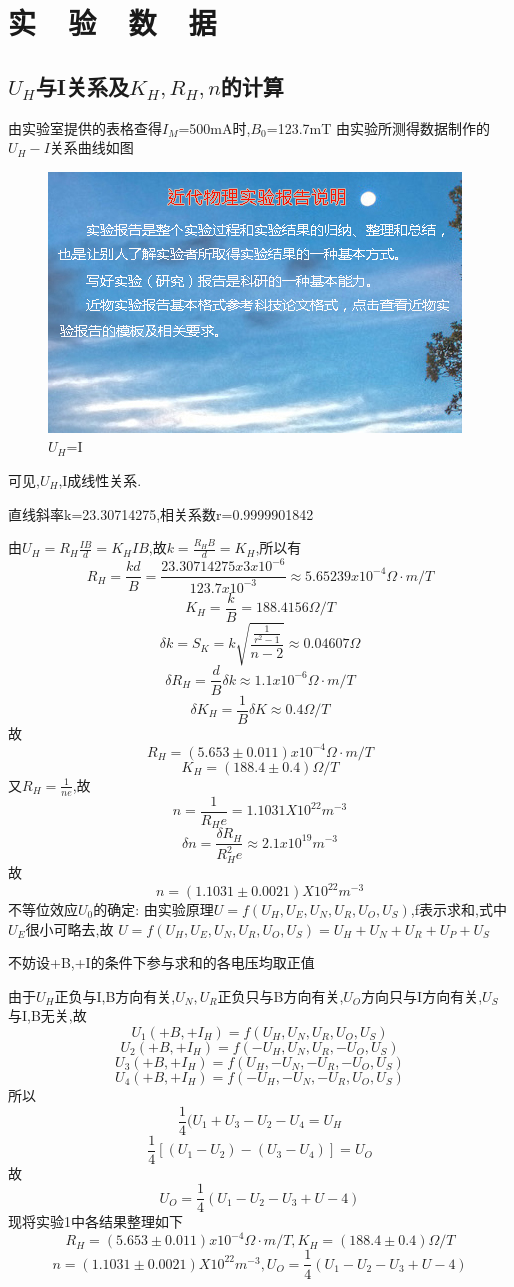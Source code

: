 \documentclass{thuemp}
\begin{document}
\section{实~~验~~数~~据}

\subsection{$U_{H}$与I关系及$K_{H},R_{H},n$的计算}

由实验室提供的表格查得$I_{M}$=500mA时,$B_{0}$=123.7mT
由实验所测得数据制作的$U_{H}-I$关系曲线如图
\begin{figure}[H]
	\centering
	\includegraphics[width=0.8\linewidth]{./image/example.jpg}
	\caption{$U_{H}$=I} \label{fig:eg}
\end{figure}
可见,$U_{H}$,I成线性关系.

直线斜率k=23.30714275,相关系数r=0.9999901842

由$U_{H}=R_{H}\frac{IB}{d}=K_{H}IB$,故$k=\frac{R_{H}B}{d}=K_{H}$,所以有
\[R_{H}=\frac{kd}{B}=\frac{23.30714275x3x10^{-6}}{123.7x10^{-3}}\approx5.65239x10^{-4} \Omega·m/T\]
\[K_{H}=\frac{k}{B}=188.4156 \Omega/T\]
\[\delta k =S_{K}=k\sqrt{\frac{\frac{1}{r^{2}-1}}{n-2}}\approx0.04607\Omega\]
\[\delta R_{H} = \frac{d}{B}\delta k \approx 1.1x10^{-6} \Omega·m/T\]
\[\delta K_{H} = \frac{1}{B}\delta K \approx 0.4\Omega/T\]
故\[R_{H}=(5.653\pm0.011)x10^{-4} \Omega ·m/T\]
\[K_{H}=(188.4\pm 0.4 )\Omega /T\]
又$R_{H}=\frac{1}{ne}$,故\[n=\frac{1}{R_{H}e}=1.1031X10^{22}m^{-3}\]
\[\delta n =\frac{\delta R_{H}}{R_{H}^{2}e}\approx2.1x10^{19}m^{-3}\]
故\[n=(1.1031\pm0.0021)X10^{22}m^{-3}\]
不等位效应$U_{0}$的确定:
由实验原理$U=f(U_{H},U_{E},U_{N},U_{R},U_{O},U_{S})$,f表示求和,式中$U_{E}$很小可略去,故
$U=f(U_{H},U_{E},U_{N},U_{R},U_{O},U_{S})=U_{H}+U_{N}+U_{R}+U_{P}+U_{S}$

不妨设+B,+I的条件下参与求和的各电压均取正值

由于$U_{H}$正负与I,B方向有关,$U_{N},U_{R}$正负只与B方向有关,$U_{O}$方向只与I方向有关,$U_{S}$与I,B无关,故
\[U_{1}(+B,+I_{H})=f(U_{H},U_{N},U_{R},U_{O},U_{S})\]
\[U_{2}(+B,+I_{H})=f(-U_{H},U_{N},U_{R},-U_{O},U_{S})\]
\[U_{3}(+B,+I_{H})=f(U_{H},-U_{N},-U_{R},-U_{O},U_{S})\]
\[U_{4}(+B,+I_{H})=f(-U_{H},-U_{N},-U_{R},U_{O},U_{S})\]
所以
\[\frac{1}{4}(U_{1}+U_{3}-U_{2}-U_{4}=U_{H}\]
\[\frac{1}{4}[(U_{1}-U_{2})-(U_{3}-U_{4})]=U_{O}\]
故\[U_{O}=\frac{1}{4}(U_{1}-U_{2}-U_{3}+U-{4})\]
现将实验1中各结果整理如下
\[R_{H}=(5.653\pm0.011)x10^{-4} \Omega ·m/T,K_{H}=(188.4\pm 0.4 )\Omega /T\]
\[n=(1.1031\pm0.0021)X10^{22}m^{-3},U_{O}=\frac{1}{4}(U_{1}-U_{2}-U_{3}+U-{4})\]
\end{document}
